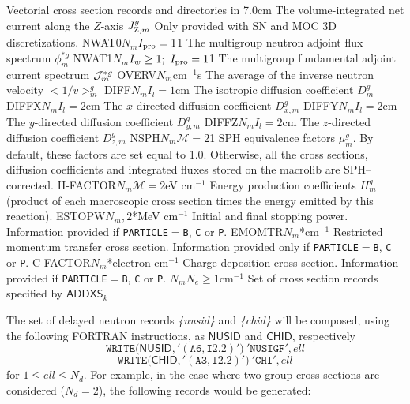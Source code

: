 \begin{DescriptionEnregistrement}{Vectorial cross section records and directories in
}{7.0cm}
  {The volume-integrated net current along the $Z$-axis $J_{{\rm Z},m}^{g}$ Only provided
  with SN and MOC 3D discretizations.}
\OptRealEnr
  {NWAT0}{$N_{m}$}{$I_{\rm pro}=1$}{1}
  {The multigroup neutron adjoint flux spectrum $\phi_{m}^{*g}$} 
\OptRealEnr
  {NWAT1}{$N_{m}$}{$I_{w}\ge 1; \ I_{\rm pro}=1$}{1}
  {The multigroup fundamental adjoint current spectrum ${\cal J}_{m}^{*g}$} 
\RealEnr
  {OVERV}{$N_{m}$}{cm$^{-1}$s}  
  {The average of the inverse neutron velocity \hbox{$<1/v>_{m}^g$}}
\OptRealEnr
  {DIFF}{$N_{m}$}{$I_{l}=1$}{cm}  
  {The isotropic diffusion coefficient
   $D_{m}^{g}$}
\OptRealEnr
  {DIFFX}{$N_{m}$}{$I_{l}=2$}{cm}  
  {The $x$-directed diffusion coefficient
   $D_{x,m}^{g}$}
\OptRealEnr
  {DIFFY}{$N_{m}$}{$I_{l}=2$}{cm}  
  {The $y$-directed diffusion coefficient
   $D_{y,m}^{g}$}
\OptRealEnr
  {DIFFZ}{$N_{m}$}{$I_{l}=2$}{cm}  
  {The $z$-directed diffusion coefficient
   $D_{z,m}^{g}$}
\OptRealEnr
  {NSPH}{$N_{m}$}{$\mathcal{M}=2$}{1}  
  {SPH equivalence factors $\mu_{m}^{g}$. By default, these factors are set equal to 1.0.
  Otherwise, all the cross sections, diffusion coefficients and integrated fluxes stored on the {\sc
  macrolib} are SPH--corrected.}
\OptRealEnr
  {H-FACTOR}{$N_{m}$}{$\mathcal{M}=2$}{eV cm$^{-1}$}  
  {Energy production coefficients $H_{m}^{g}$ (product of each macroscopic cross section
  times the energy emitted by this reaction).}
\OptRealEnr
  {ESTOPW}{$N_{m},2$}{*}{MeV cm$^{-1}$}  
  {Initial and final stopping power. Information provided if {\tt PARTICLE}$=${\tt B}, {\tt C} or {\tt P}.}
\OptRealEnr
  {EMOMTR}{$N_{m}$}{*}{cm$^{-1}$}  
  {Restricted momentum transfer cross section. Information provided only if {\tt PARTICLE}$=${\tt B}, {\tt C} or {\tt P}.}
\OptRealEnr
  {C-FACTOR}{$N_{m}$}{*}{electron cm$^{-1}$}  
  {Charge deposition cross section. Information provided if {\tt PARTICLE}$=${\tt B}, {\tt C} or {\tt P}.}
\OptRealVar
  {}{$N_{m}$}{$N_{e}\ge 1$}{cm$^{-1}$}
  {Set of cross section records specified by $\mathsf{ADDXS}_{k}$}
\end{DescriptionEnregistrement}

The set of delayed neutron records {\sl \{nusid\}} and {\sl \{chid\}} will be
composed, using the following FORTRAN instructions, as $\mathsf{NUSID}$ and $\mathsf{CHID}$,
respectively
  \begin{displaymath}
    \mathtt{WRITE(}\mathsf{NUSID}\mathtt{,'(A6,I2.2)')} \ \mathtt{'NUSIGF'},ell
  \end{displaymath}
  \begin{displaymath}
    \mathtt{WRITE(}\mathsf{CHID}\mathtt{,'(A3,I2.2)')} \ \mathtt{'CHI'},ell
  \end{displaymath}
for $1\leq ell \leq N_d$. For example, in the case where two group cross sections are considered
($N_d=2$), the following records would be generated:

